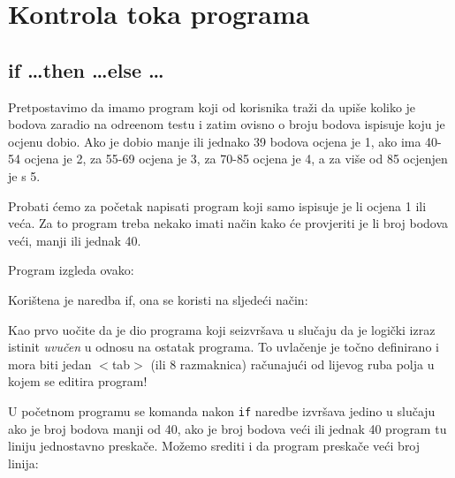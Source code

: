 \chapter{Kontrola toka programa}

\section{if \dots then \dots else \dots}

Pretpostavimo da imamo program koji od korisnika tra\v{z}i da upi\v{s}e
koliko je bodova zaradio na odre\dj{}enom testu i zatim ovisno o broju
bodova ispisuje koju je ocjenu dobio. Ako je dobio manje ili jednako
39 bodova ocjena je 1, ako ima 40-54 ocjena je 2, za 55-69 ocjena
je 3, za 70-85 ocjena je 4, a za vi\v{s}e od 85 ocjenjen je s 5.

Probati \'{c}emo za po\v{c}etak napisati program koji samo ispisuje je
li ocjena 1 ili ve\'{c}a. Za to program treba nekako imati na\v{c}in kako
\'{c}e provjeriti je li broj bodova ve\'{c}i, manji ili jednak 40.

Program izgleda ovako:


Kori\v{s}tena je naredba if, ona se koristi na sljede\'{c}i na\v{c}in:


Kao prvo uo\v{c}ite da je dio programa koji seizvr\v{s}ava u slu\v{c}aju da
je logi\v{c}ki izraz istinit \emph{uvu\v{c}en} u odnosu na ostatak
programa. To uvla\v{c}enje je to\v{c}no definirano i mora biti jedan
$<$tab$>$ (ili 8 razmaknica) ra\v{c}unaju\'{c}i od lijevog ruba polja u kojem se
editira program!

U po\v{c}etnom programu se komanda nakon \verb"if" naredbe izvr\v{s}ava
jedino u slu\v{c}aju ako je broj bodova manji od 40, ako je broj bodova
ve\'{c}i ili jednak 40 program tu liniju jednostavno preska\v{c}e. Mo\v{z}emo
srediti i da program preska\v{c}e ve\'{c}i broj linija:

